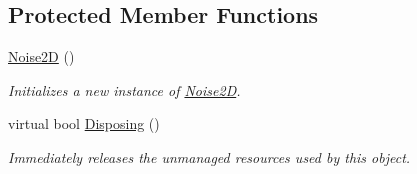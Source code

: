 \subsection*{Protected Member Functions}
\begin{DoxyCompactItemize}
\item 
\hyperlink{class_lib_noise_1_1_noise2_d_a53ddafc2f6a099d939f1eaad03a1d8fa}{Noise2D} ()
\begin{DoxyCompactList}\small\item\em Initializes a new instance of \hyperlink{class_lib_noise_1_1_noise2_d}{Noise2D}. \end{DoxyCompactList}\item 
virtual bool \hyperlink{class_lib_noise_1_1_noise2_d_a937c13bf6b73e1e9b85e499f97bd1eb2}{Disposing} ()
\begin{DoxyCompactList}\small\item\em Immediately releases the unmanaged resources used by this object. \end{DoxyCompactList}\end{DoxyCompactItemize}
